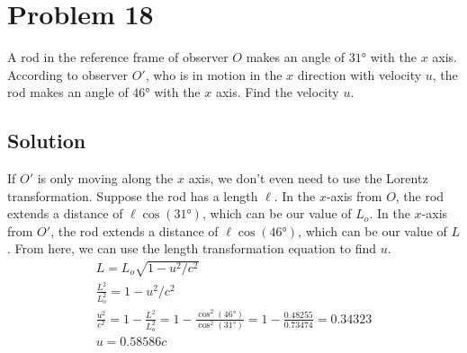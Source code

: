 \documentclass[12pt]{article}
\begin{document}
\section{Problem 18}
    A rod in the reference frame of observer $O$ makes an angle of $31\unit{\degree}$ with the $x$ axis. 
    According to observer $O'$, who is in motion in the $x$ direction with velocity $u$, the rod makes an angle of $46\unit{\degree}$ with the $x$ axis. 
    Find the velocity $u$.

    \subsection{Solution}
        If $O'$ is only moving along the $x$ axis, we don't even need to use the Lorentz transformation.
        Suppose the rod has a length $\ell$.
        In the $x$-axis from $O$, the rod extends a distance of $\ell\cos(31\unit\degree)$, which can be our value of $L_o$.
        In the $x$-axis from $O'$, the rod extends a distance of $\ell\cos(46\unit\degree)$, which can be our value of $L$.
        From here, we can use the length transformation equation to find $u$.
        \begin{gather}
            L = L_o \sqrt{1 - u^2/c^2}\\
            \frac{L^2}{L_o^2} = 1 - u^2/c^2\\
            \frac{u^2}{c^2} =   1 - \frac{L^2}{L_o^2}
                =   1 - \frac{\cos^2(46\unit\degree)}{\cos^2(31\unit\degree)}
                =   1 - \frac{0.48255}{0.73474}
                =   0.34323\\
            \boxed{u = 0.58586c}
        \end{gather}
\end{document}
